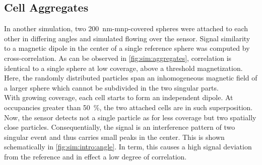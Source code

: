 \subsection{Cell Aggregates}
In another simulation, two \SI{200}{\nano\meter}-\gls{mnp}-covered spheres were attached to each other in differing angles and simulated flowing over the sensor. Signal similarity to a magnetic dipole in the center of a single reference sphere was computed by cross-correlation. As can be observed in \cref{fig:sim:aggregates}, correlation is identical to a single sphere at low coverage, above a threshold magnetization. Here, the randomly distributed particles span an inhomogeneous magnetic field of a larger sphere which cannot be subdivided in the two singular parts.\\
With growing coverage, each cell starts to form an independent dipole. At occupancies greater than \SI{50}{\percent}, the two attached cells are in such superposition. Now, the sensor detects not a single particle as for less coverage but two spatially close particles. Consequentially, the signal is an interference pattern of two singular event and thus carries small peaks in the center. This is shown schematically in \cref{fig:sim:intro:angle}. In term, this causes a high signal deviation from the reference and in effect a low degree of correlation.
\clearpage
\begin{figure}[h!]
	\centering
	 \hfill
	\addtocounter{subfigure}{-1}
	\label{fig:sim:CorrDiff}
\end{figure}
